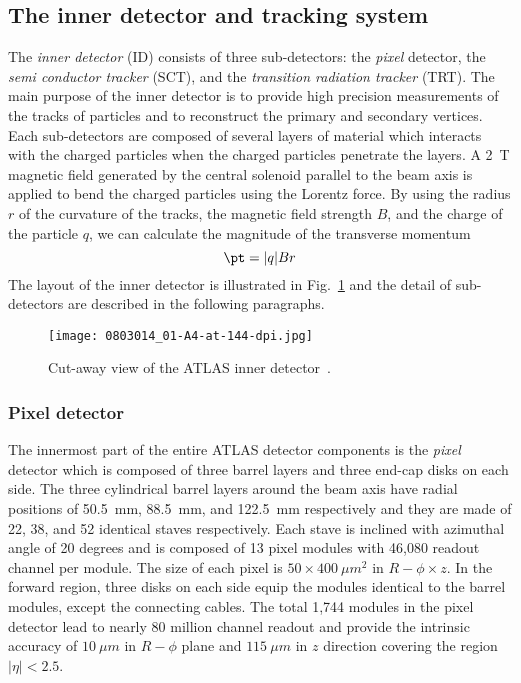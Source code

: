 
\subsection{The inner detector and tracking system}
\label{subsec:ae_inner_detector}
The \textit{inner detector} (ID) consists of three sub-detectors: the \textit{pixel} detector, the \textit{semi conductor tracker}  (SCT), and the \textit{transition radiation tracker} (TRT).
The main purpose of the inner detector is to provide high precision measurements of the tracks of particles and to reconstruct the primary and secondary vertices.
Each sub-detectors are composed of several layers of material which interacts with the charged particles when the charged particles penetrate the layers.
A  2~T magnetic field generated by the central solenoid parallel to the beam axis is applied to bend the charged particles using the Lorentz force.
By using the radius $r$ of the curvature of the tracks, the magnetic field strength $B$, and the charge of the particle $q$, we can calculate the magnitude of the transverse momentum \pt
%
\begin{equation}
    \pt = |q|Br
\end{equation}
%
The layout of the inner detector is illustrated in Fig.~\ref{fig:ae_inner_detector} and the detail of sub-detectors are described in the following paragraphs.

\begin{figure}[htbp]
    \begin{center}
        \texttt{[image: 0803014\_01-A4-at-144-dpi.jpg]}
        \caption{Cut-away view of the ATLAS inner detector~\cite{Aad:2008zzm}.}
        \label{fig:ae_inner_detector}
    \end{center}
\end{figure}


\subsubsection{Pixel detector}
\label{subsubsec:ae_pixel}
The innermost part of the entire ATLAS detector components is the \textit{pixel} detector which is composed of three barrel layers and three end-cap disks on each side.
The three cylindrical barrel layers around the beam axis have radial positions of 50.5~mm, 88.5~mm, and 122.5~mm respectively and they are made of 22, 38, and 52 identical staves respectively.
Each stave is inclined with azimuthal angle of 20 degrees and is composed of 13 pixel modules with 46,080 readout channel per module.
The size of each pixel is $50 \times 400~\mu m^{2}$ in $R-\phi \times z$.
In the forward region, three disks on each side equip the modules identical to the barrel modules, except the connecting cables. 
The total 1,744 modules in the pixel detector lead to nearly 80 million channel readout and provide the intrinsic accuracy of $10~\mu m$ in $R-\phi$ plane and $115~\mu m$ in $z$ direction covering the region $|\eta| < 2.5$. 

